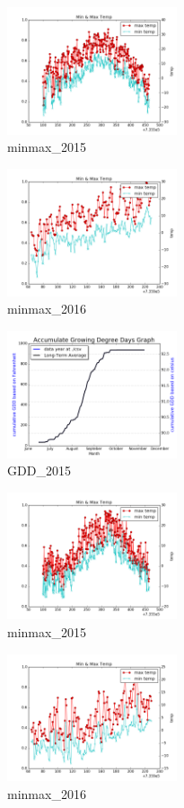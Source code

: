 \documentclass[DIV=calc, paper=a4, fontsize=11pt, twocolumn]{scrartcl}
\begin{document}
\begin{figure}[h!]
	\centering
	\includegraphics[width=50mm]{../output/27211_2015_minmax.png}
    \caption{minmax_2015}
	\label{fig:method8}
\end{figure}
\begin{figure}[h!]
	\centering
	\includegraphics[width=50mm]{../output/27211_2016_minmax.png}
    \caption{minmax_2016}
	\label{fig:method9}
\end{figure}
\begin{figure}[h!]
	\centering
	\includegraphics[width=50mm]{../output/50089_2015_gdd.png}
    \caption{GDD_2015}
	\label{fig:method10}
\end{figure}
\begin{figure}[h!]
	\centering
	\includegraphics[width=50mm]{../output/50089_2015_minmax.png}
    \caption{minmax_2015}
	\label{fig:method11}
\end{figure}
\begin{figure}[h!]
	\centering
	\includegraphics[width=50mm]{../output/50089_2016_minmax.png}
    \caption{minmax_2016}
	\label{fig:method12}
\end{figure}
\end{document}
